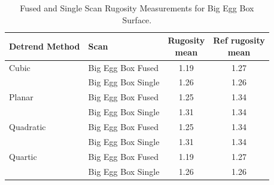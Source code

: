 \begin{table}[ht]
	\centering
	\small
	\setlength{\tabcolsep}{8pt}
	\caption{Fused and Single Scan Rugosity Measurements for Big Egg Box Surface.}
	\label{tab:Big_Egg_Rugosity}
	\begin{tabular}{l l c c}
		\toprule
		Detrend Method & Scan & \makecell{Rugosity\\{\footnotesize mean}} & \makecell{Ref rugosity\\{\footnotesize mean}} \\
		\midrule
		Cubic & Big Egg Box Fused & 1.19 & 1.27 \\
		 & Big Egg Box Single & 1.26 & 1.26 \\
		\addlinespace
		Planar & Big Egg Box Fused & 1.25 & 1.34 \\
		 & Big Egg Box Single & 1.31 & 1.34 \\
		\addlinespace
		Quadratic & Big Egg Box Fused & 1.25 & 1.34 \\
		 & Big Egg Box Single & 1.31 & 1.34 \\
		\addlinespace
		Quartic & Big Egg Box Fused & 1.19 & 1.27 \\
		 & Big Egg Box Single & 1.26 & 1.26 \\
		\bottomrule
	\end{tabular}
\end{table}
